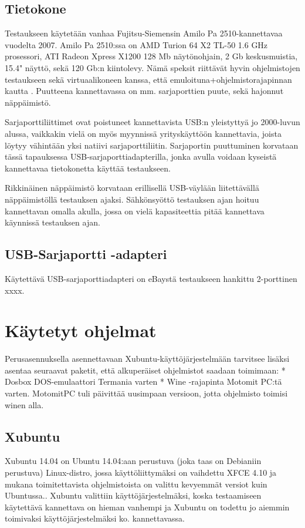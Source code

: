 \documentclass[11pt,a4paper,oneside,article]{memoir}
\begin{document}
\subsection{Tietokone}
Testaukseen käytetään vanhaa Fujitsu-Siemensin Amilo Pa 2510-kannettavaa vuodelta 2007. Amilo Pa 2510:ssa on AMD Turion 64 X2 TL-50 1.6 GHz prosessori, ATI Radeon Xpress X1200 128 Mb näytönohjain, 2 Gb keskusmuistia, 15.4" näyttö, sekä 120 Gb:n kiintolevy. Nämä speksit riittävät hyvin ohjelmistojen testaukseen sekä virtuaalikoneen kanssa, että emuloituna+ohjelmistorajapinnan kautta \cite{fs_amilo:review}. Puutteena kannettavassa on mm. sarjaporttien puute, sekä hajonnut näppäimistö. 

Sarjaporttiliittimet ovat poistuneet kannettavista USB:n yleistyttyä jo 2000-luvun alussa, vaikkakin vielä on myös myynnissä yrityskäyttöön kannettavia, joista löytyy vähintään yksi natiivi sarjaporttiliitin\cite{hp:laptop}. Sarjaportin puuttuminen korvataan tässä tapauksessa USB-sarjaporttiadapterilla, jonka avulla voidaan kyseistä kannettavaa tietokonetta käyttää testaukseen.

Rikkinäinen näppäimistö korvataan erillisellä USB-väylään liitettävällä näppäimistöllä testauksen ajaksi. Sähkönsyöttö testauksen ajan hoituu kannettavan omalla akulla, jossa on vielä kapasiteettia pitää kannettava käynnissä testauksen ajan.

\subsection{USB-Sarjaportti -adapteri}
Käytettävä USB-sarjaporttiadapteri on eBaystä testaukseen hankittu 2-porttinen xxxx. 


\section{Käytetyt ohjelmat}

Perusasennuksella asennettavaan Xubuntu-käyttöjärjestelmään tarvitsee
lisäksi asentaa seuraavat paketit, että alkuperäiset ohjelmistot saadaan
toimimaan: * Dosbox DOS-emulaattori Termania varten * Wine -rajapinta
Motomit PC:tä varten. MotomitPC tuli päivittää uusimpaan versioon, jotta
ohjelmisto toimisi winen alla.

\subsection{Xubuntu}

Xubuntu 14.04 on Ubuntu 14.04:aan perustuva (joka taas on Debianiin perustuva) Linux-distro, jossa 
käyttöliittymäksi on vaihdettu XFCE 4.10 ja mukana toimitettavista ohjelmistoista on valittu kevyemmät 
versiot kuin Ubuntussa.\cite{xubuntu:about}. Xubuntu valittiin käyttöjärjestelmäksi, koska testaamiseen 
käytettävä kannettava on hieman vanhempi ja Xubuntu on todettu jo aiemmin toimivaksi käyttöjärjestelmäksi ko. kannettavassa.
\end{document}
